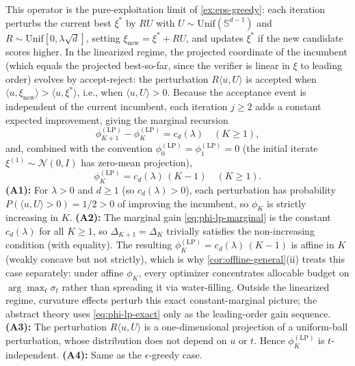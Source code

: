%
\begin{example}[Local perturbation search ($\epsilon$-greedy with $\epsilon = 0$)]
\label{ex:local-perturbation}
This operator is the pure-exploitation limit of \cref{ex:eps-greedy}: each iteration perturbs the current best $\xi^*$ by $RU$ with $U \sim \mathrm{Unif}(\mathbb{S}^{d-1})$ and $R \sim \mathrm{Unif}[0, \lambda\sqrt{d}]$, setting $\xi_{\mathrm{new}} = \xi^* + RU$, and updates $\xi^*$ if the new candidate scores higher. In the linearized regime, the projected coordinate of the incumbent (which equals the projected best-so-far, since the verifier is linear in $\xi$ to leading order) evolves by accept-reject: the perturbation $R\langle u, U\rangle$ is accepted when $\langle u, \xi_{\mathrm{new}}\rangle > \langle u, \xi^*\rangle$, i.e., when $\langle u, U\rangle > 0$. Because the acceptance event is independent of the current incumbent, each iteration $j \ge 2$ adds a constant expected improvement, giving the marginal recursion
\begin{equation}
  \phi_{K+1}^{(\mathrm{LP})} - \phi_K^{(\mathrm{LP})} = c_d(\lambda) \quad (K \ge 1),
  \label{eq:phi-lp-marginal}
\end{equation}
and, combined with the convention $\phi_0^{(\mathrm{LP})} = \phi_1^{(\mathrm{LP})} = 0$ (the initial iterate $\xi^{(1)} \sim \mathcal{N}(0,I)$ has zero-mean projection),
\begin{equation}
  \phi_K^{(\mathrm{LP})} = c_d(\lambda)\,(K-1) \quad (K \ge 1).
  \label{eq:phi-lp-exact}
\end{equation}
\textbf{(A1):} For $\lambda > 0$ and $d \ge 1$ (so $c_d(\lambda) > 0$), each perturbation has probability $P(\langle u, U\rangle > 0) = 1/2 > 0$ of improving the incumbent, so $\phi_K$ is strictly increasing in $K$. \textbf{(A2):} The marginal gain \cref{eq:phi-lp-marginal} is the constant $c_d(\lambda)$ for all $K \ge 1$, so $\Delta_{K+1} = \Delta_K$ trivially satisfies the non-increasing condition (with equality). The resulting $\phi_K^{(\mathrm{LP})} = c_d(\lambda)\,(K-1)$ is affine in $K$ (weakly concave but not strictly), which is why \cref{cor:offline-general}\textup{(ii)} treats this case separately: under affine $\phi_K$, every optimizer concentrates allocable budget on $\arg\max_t \sigma_t$ rather than spreading it via water-filling. Outside the linearized regime, curvature effects perturb this exact constant-marginal picture; the abstract theory uses \cref{eq:phi-lp-exact} only as the leading-order gain sequence. \textbf{(A3):} The perturbation $R\langle u, U\rangle$ is a one-dimensional projection of a uniform-ball perturbation, whose distribution does not depend on $u$ or $t$. Hence $\phi_K^{(\mathrm{LP})}$ is $t$-independent. \textbf{(A4):} Same as the $\epsilon$-greedy case.
\end{example}
